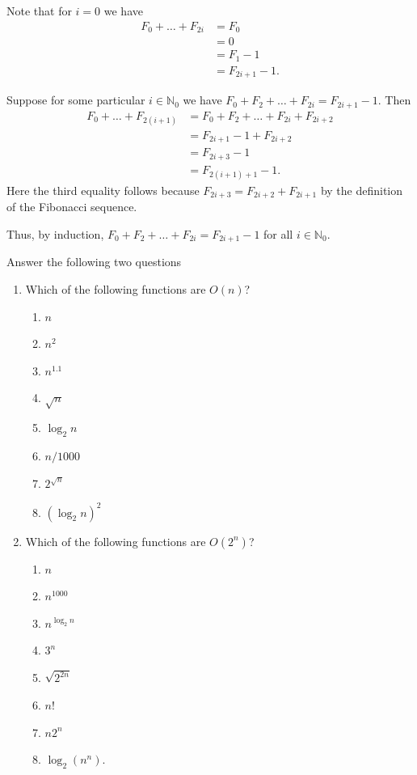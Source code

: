 \documentclass[12 pt, letterpaper]{hmcpset}
\begin{document}
\begin{solution}
	Note that for $i = 0$ we have
	\begin{align*}
		F_{0} + \dots + F_{2i} & = F_{0} \\
				       & = 0 \\
				       & = F_{1} - 1 \\
				       & = F_{2 i + 1} - 1.
	\end{align*}

	Suppose for some particular $i \in \mathbb{N}_{0}$ we have $F_{0} + F_{2} + \dots + F_{2 i} = F_{2i + 1} - 1$. Then 
	\begin{align*}
		F_{0} + \dots + F_{2 (i + 1)} & = F_{0} + F_{2} + \dots + F_{2 i} + F_{2 i + 2} \\
					      & = F_{2 i + 1} - 1 + F_{2 i + 2} \\
					      & = F_{2 i + 3} - 1 \\
					      & = F_{2(i + 1) + 1} - 1.
	\end{align*}
	Here the third equality follows because $F_{2i + 3} = F_{2i + 2} + F_{2i + 1}$ by the definition of the Fibonacci sequence.

	Thus, by induction, $F_{0} + F_{2} + \dots + F_{2i} = F_{2i + 1} - 1$ for all $i \in \mathbb{N}_{0}$.
\end{solution}

\pagebreak

\begin{problem}
	Answer the following two questions
	\begin{enumerate}[label = \arabic*.]
		\item Which of the following functions are $O(n)$?
			\begin{enumerate}
				\item $n$
				\item $n^{2}$
				\item $n^{1.1}$ 
				\item $\sqrt{n}$ 
				\item $\log_{2} n$ 
				\item $n / 1000$
				\item  $2^{\sqrt{n}}$
				\item  $(\log_{2} n)^{2}$
			\end{enumerate}
			
		\item Which of the following functions are $O(2^{n})$?
			\begin{enumerate}
				\item $n$ 
				\item $n^{1000}$
				\item $n^{\log_{2} n}$ 
				\item $3^{n}$ 
				\item $\sqrt{2^{2n}}$ 
				\item $n!$ 
				\item $n 2^{n}$ 
				\item $\log_{2}(n^{n})$.
			\end{enumerate}
	\end{enumerate}
\end{problem}
\end{document}
